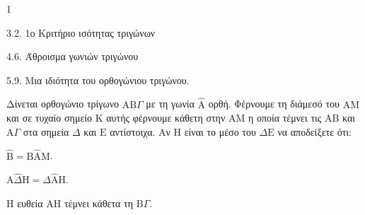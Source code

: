 \begin{ylh}{1}
    \item 3.2. 1ο Κριτήριο ισότητας τριγώνων
    \item 4.6. Άθροισμα γωνιών τριγώνου
    \item 5.9. Μια ιδιότητα του ορθογώνιου τριγώνου.
\end{ylh}
Δίνεται ορθογώνιο τρίγωνο $\mathrm{A}\mathrm{B}\Gamma$ με τη γωνία $\hat{\mathrm{A}}$ ορθή. Φέρνουμε τη διάμεσό του $\mathrm{A}\mathrm{M}$ και σε τυχαίο σημείο $\mathrm{K}$ αυτής φέρνουμε κάθετη στην $\mathrm{A}\mathrm{M}$ η οποία τέμνει τις $\mathrm{A}\mathrm{B}$ και $\mathrm{A}\Gamma$ στα σημεία $\Delta$ και $\mathrm{E}$ αντίστοιχα. Αν $\mathrm{H}$ είναι το μέσο του $\Delta\mathrm{E}$ να αποδείξετε ότι:
\begin{alist}
    \item $\hat{\mathrm{B}} = \mathrm{B}\hat{\mathrm{A}}\mathrm{M}$. 
    \item $\mathrm{A}\hat{\Delta}\mathrm{H} = \Delta\hat{\mathrm{A}}\mathrm{H}$. 
    \item Η ευθεία $\mathrm{A}\mathrm{H}$ τέμνει κάθετα τη $\mathrm{B}\Gamma$. 
\end{alist}
